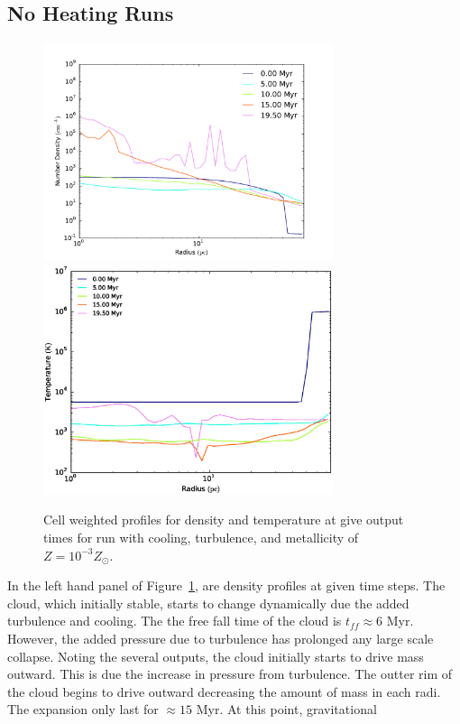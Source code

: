 \documentclass[useAMS,usenatbib]{mn2e}
\begin{document}
\subsection{No Heating Runs}
\begin{figure}
\begin{center}
\includegraphics[width=8.5cm]{Images/density_series-eps-converted-to}
\includegraphics[width=8.5cm]{Images/temperature_series}
\end{center}
\caption{\label{fig:profile_turbulence}} Cell weighted profiles for density
and temperature at give output times for run with cooling, turbulence, and
metallicity of $Z=10^{-3}Z_\odot$.
\end{figure}
In the left hand panel of Figure~\ref{fig:profile_turbulence}, are density profiles at given time steps.
The cloud, which initially stable, starts to change dynamically due the added
turbulence and cooling. The the free fall time of the cloud is $t_{ff}\approx 6$
Myr. However, the added pressure due to turbulence has prolonged any large scale
collapse. Noting the several outputs, the cloud initially starts to drive mass
outward. This is due the increase in pressure from turbulence. The outter rim
of the cloud begins to drive outward decreasing the amount of mass in each radi.
The expansion only last for $\approx 15$ Myr. At this point, gravitational
\end{document}
